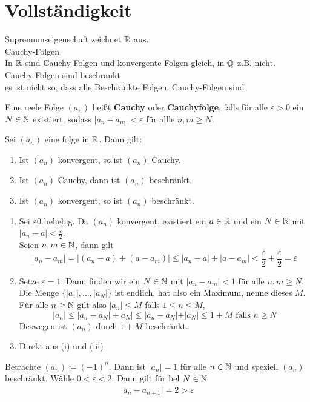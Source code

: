 \documentclass[consecutivenumbering]{gadsescript}
\begin{document}
\section{Vollständigkeit}
Supremumseigenschaft zeichnet $ \mathbb{R} $ aus.\\
Cauchy-Folgen\\
In $ \mathbb{R} $ sind Cauchy-Folgen und konvergente Folgen gleich, in $ \mathbb{Q} $ z.B. nicht.\\
Cauchy-Folgen sind beschränkt\\
es ist nicht so, dass alle Beschränkte Folgen, Cauchy-Folgen sind\\
\begin{subdefinition}[Cauchyfolge]
	Eine reele Folge $(a_n)$ heißt \textbf{Cauchy} oder \textbf{Cauchyfolge}, falls für alle $\varepsilon > 0 $ ein $ N \in \mathbb{N} $ existiert, sodass $ |a_n - a_m| < \varepsilon $ für allle $ n, m \geq N $.
\end{subdefinition}

\begin{subtheorem}
	Sei $ (a_n) $ eine folge in $ \mathbb{R} $. Dann gilt:
	\begin{enumerate}[label=(\roman*)]
		\item Ist $ (a_n) $ konvergent, so ist $ (a_n) $-Cauchy.
		\item Ist $ (a_n) $ Cauchy, dann ist $ (a_n) $ beschränkt.
		\item Ist $ (a_n) $ konvergent, so ist $ (a_n) $ beschränkt.
	\end{enumerate}
	\begin{subproof*}
		\begin{enumerate}[label=(\roman*)]
			\item Sei $ \varepsilon 0 $ beliebig. Da $ (a_n) $ konvergent, existiert ein $ a \in \mathbb{R} $ und ein $ N \in \mathbb{N} $ mit $ |a_n - a| < \frac{\varepsilon}{2} $.\\
				Seien $ n, m \in \mathbb{N} $, dann gilt
				\[ | a_n - a_m| = | (a_n - a) + (a- a_m)| \leq |a_n - a| + |a - a_m| < \frac{\varepsilon}{2} + \frac{\varepsilon}{2} = \varepsilon \]
			\item Setze $ \varepsilon = 1 $. Dann finden wir ein $ N \in \mathbb{N} $ mit $ |a_n - a_m| < 1 $ für alle $ n, m \geq N $.\\
				Die Menge $ \{ |a_1|,\dotsc, |a_N| \} $ ist endlich, hat also ein Maximum, nenne dieses $ M $.\\
				Für alle $ n \geq \mathbb{N} $ gilt also $ |a_n| \leq M $ falls $ 1 \leq n \leq M $,
				\[ |a_n| \leq |a_n - a_N| + a_N| \leq |a_n - a_N| + |a_N| \leq 1 + M \text{ falls } n \geq N \]
				Deswegen ist $ (a_n) $ durch $ 1 + M $ beschränkt.
			\item Direkt aus (i) und (iii)
		\end{enumerate}
	\end{subproof*}
\end{subtheorem}
\begin{subexample}
	Betrachte $ (a_n) \coloneqq (-1)^n $. Dann ist $ |a_n| = 1 $ für alle $ n \in \mathbb{N} $ und speziell $ (a_n) $ beschränkt. Wähle $ 0 < \varepsilon < 2 $. Dann gilt für bel $ N \in \mathbb{N} $
	\[ |a_n - a_{n+1}| = 2 > \varepsilon \]
\end{subexample}
\end{document}
